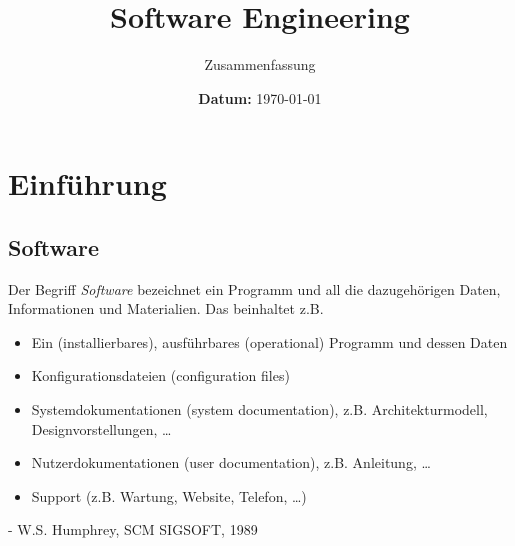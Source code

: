 \documentclass[ngerman]{tuda_summary}
\date{\textbf{\sffamily Datum:} \today}
\begin{document}
\title[SE]{Software Engineering}

\subtitle{Zusammenfassung}
\maketitle{}
\tableofcontents

\clearpage
\section{Einführung}
\subsection{Software}
\begin{definition}[Software]
    Der Begriff \textit{Software} bezeichnet ein Programm und all die dazugehörigen Daten, Informationen und Materialien. Das beinhaltet z.B.\begin{itemize}
        \item Ein (installierbares), ausführbares (operational) Programm und dessen Daten
        \item Konfigurationsdateien (configuration files)
        \item Systemdokumentationen (system documentation), z.B. Architekturmodell, Designvorstellungen, \dots
        \item Nutzerdokumentationen (user documentation), z.B. Anleitung, \dots
        \item Support (z.B. Wartung, Website, Telefon, \dots)
    \end{itemize}
    \hfill - W.S. Humphrey, SCM SIGSOFT, 1989
\end{definition}
\end{document}
